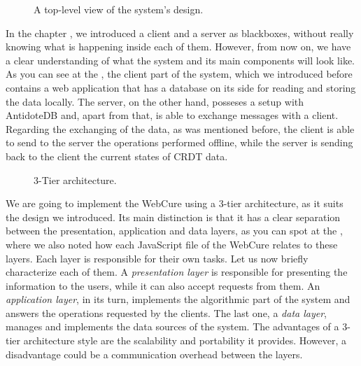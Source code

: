 \begin{figure}[!htb]
    \begin{center}
        \setlength{\fboxsep}{15pt}%
        \setlength{\fboxrule}{1pt}%
    \def\svgwidth{\linewidth}
    \fbox{}
    \caption {A top-level view of the system's design.}
    \label{fig:impl1}
\end{center}
\end{figure}

In the chapter , we introduced a client and a server as blackboxes, without really knowing what is happening inside each of them. However, from now on, we have a clear understanding of what the system and its main components will look like. As you can see at the , the client part of the system, which we introduced before contains a web application that has a database on its side for reading and storing the data locally. The server, on the other hand, posseses a setup with AntidoteDB and, apart from that, is able to exchange messages with a client. Regarding the exchanging of the data, as was mentioned before, the client is able to send to the server the operations performed offline, while the server is sending back to the client the current states of CRDT data.

\begin{figure}[!htb]
    \begin{center}
    \def\svgwidth{\linewidth}
    
    \caption {3-Tier architecture.}
    \label{fig:dev1}
\end{center}
\end{figure}

We are going to implement the WebCure using a 3-tier architecture\cite{51}, as it suits the design we introduced. Its main distinction is that it has a clear separation between the presentation, application and data layers, as you can spot at the , where we also noted how each JavaScript file of the WebCure relates to these layers. Each layer is responsible for their own tasks. Let us now briefly characterize each of them. A \textit{presentation layer} is responsible for presenting the information to the users, while it can also accept requests from them. An \textit{application layer}, in its turn, implements the algorithmic part of the system and answers the operations requested by the clients. The last one, a \textit{data layer}, manages and implements the data sources of the system. The advantages of a 3-tier architecture style are the scalability and portability it provides. However, a disadvantage could be a communication overhead between the layers\cite{50}.

